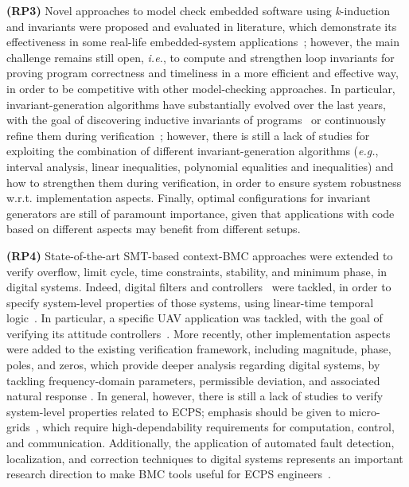 \documentclass[format=acmsmall, review=false, screen=true]{acmart}
\begin{document}
\textbf{(RP3)} Novel approaches to model check embedded software using \textit{k}-induction and invariants were proposed and evaluated in literature, which demonstrate its effectiveness in some real-life embedded-system applications~\cite{Gadelha15,Brain15,Rocha15,Donaldson10,Rocha17}; however, the main challenge remains still open, {\it i.e.}, to compute and strengthen loop invariants for proving program correctness and timeliness in a more efficient and effective way, in order to be competitive with other model-checking approaches. In particular, invariant-generation algorithms have substantially evolved over the last years, with the goal of discovering inductive invariants of programs~\cite{pips:2013,Henry:2012} or continuously refine them during verification~\cite{Beyer15}; however, there is still a lack of studies for exploiting the combination of different invariant-generation algorithms ({\it e.g.}, interval analysis, linear inequalities, polynomial equalities and inequalities) and how to strengthen them during verification, in order to ensure system robustness w.r.t. implementation aspects. Finally, optimal configurations for invariant generators are still of paramount importance, given that applications with code based on different aspects may benefit from different setups.

\textbf{(RP4)} State-of-the-art SMT-based context-BMC approaches were extended to verify overflow, limit cycle, time constraints, stability, and minimum phase, in digital systems. Indeed, digital filters and controllers~\cite{dsv_spin2015,esbmc_controller,esbmc_filter} were tackled, in order to specify system-level properties of those systems, using linear-time temporal logic~\cite{JMorse15}. In particular, a specific UAV application was tackled, with the goal of verifying its attitude controllers~\cite{Bessa16,Chaves17}. More recently, other implementation aspects were added to the existing verification framework, including magnitude, phase, poles, and zeros, which provide deeper analysis regarding digital systems, by tackling frequency-domain parameters, permissible deviation, and associated natural response \cite{sbrtdaniel}. In general, however, there is still a lack of studies to verify system-level properties related to ECPS; emphasis should be given to micro-grids~\cite{xu15}, which require high-dependability requirements for computation, control, and communication. Additionally, the application of automated fault detection, localization, and correction techniques to digital systems represents an important research direction to make BMC tools useful for ECPS engineers~\cite{Alves15}.
\end{document}
